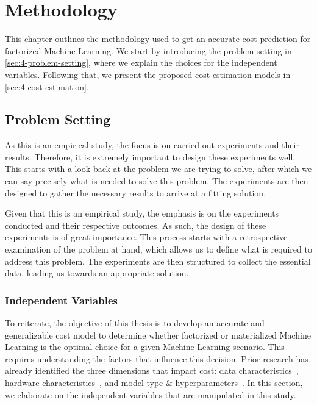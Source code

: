 
\chapter{Methodology}

\label{chapter:methodology}

This chapter outlines the methodology used to get an accurate cost prediction for factorized Machine Learning. We start by introducing the problem setting in \autoref{sec:4-problem-setting}, where we explain the choices for the independent variables. Following that, we present the proposed cost estimation models in \autoref{sec:4-cost-estimation}.

\section{Problem Setting}
\label{sec:4-problem-setting}

As this is an empirical study, the focus is on carried out experiments and their results. Therefore, it is extremely important to design these experiments well. This starts with a look back at the problem we are trying to solve, after which we can say precisely what is needed to solve this problem. The experiments are then designed to gather the necessary results to arrive at a fitting solution.

Given that this is an empirical study, the emphasis is on the experiments conducted and their respective outcomes. As such, the design of these experiments is of great importance. This process starts with a retrospective examination of the problem at hand, which allows us to define what is required to address this problem. The experiments are then structured to collect the essential data, leading us towards an appropriate solution.

\subsection{Independent Variables}
To reiterate, the objective of this thesis is to develop an accurate and generalizable cost model to determine whether factorized or materialized Machine Learning is the optimal choice for a given Machine Learning scenario. This requires understanding the factors that influence this decision. Prior research has already identified the three dimensions that impact cost: data characteristics~\cite{morpheus, amalur,amalur_tkde24}, hardware characteristics~\cite{orion_learning_gen_lin_models}, and model type \& hyperparameters~\cite{amalur,amalur_tkde24}. In this section, we elaborate on the independent variables that are manipulated in this study.

